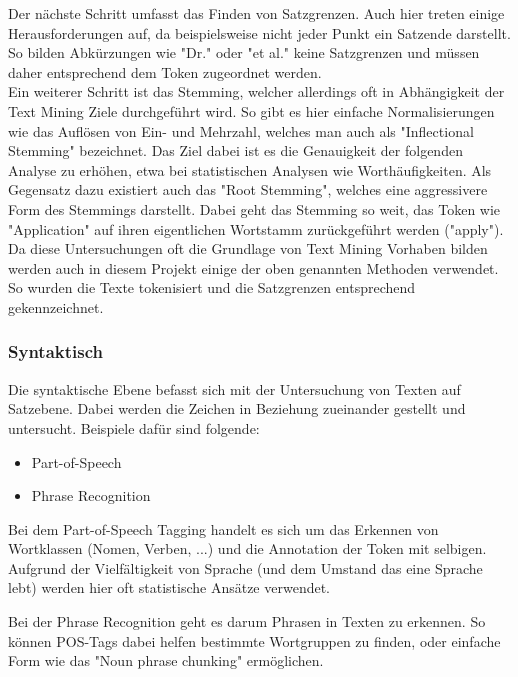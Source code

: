 Der nächste Schritt umfasst das Finden von Satzgrenzen. Auch hier treten einige Herausforderungen auf, da beispielsweise nicht jeder Punkt ein Satzende darstellt. So bilden Abkürzungen wie "Dr." oder "et al." keine Satzgrenzen und müssen daher entsprechend dem Token zugeordnet werden.\\

Ein weiterer Schritt ist das Stemming, welcher allerdings oft in Abhängigkeit der Text Mining Ziele durchgeführt wird. So gibt es hier einfache Normalisierungen wie das Auflösen von Ein- und Mehrzahl, welches man auch als "Inflectional Stemming" bezeichnet. Das Ziel dabei ist es die Genauigkeit der folgenden Analyse zu erhöhen, etwa bei statistischen Analysen wie Worthäufigkeiten. Als Gegensatz dazu existiert auch das "Root Stemming", welches eine aggressivere Form des Stemmings darstellt. Dabei geht das Stemming so weit, das Token wie "Application" auf ihren eigentlichen Wortstamm zurückgeführt werden ("apply").\\

Da diese Untersuchungen oft die Grundlage von Text Mining Vorhaben bilden werden auch in diesem Projekt einige der oben genannten Methoden verwendet. So wurden die Texte tokenisiert und die Satzgrenzen entsprechend gekennzeichnet.

\subsubsection{Syntaktisch}

Die syntaktische Ebene befasst sich mit der Untersuchung von Texten auf Satzebene. Dabei werden die Zeichen in Beziehung zueinander gestellt und untersucht. Beispiele dafür sind folgende:\\

\begin{itemize}
\item Part-of-Speech
\item Phrase Recognition
\end{itemize}

Bei dem Part-of-Speech Tagging handelt es sich um das Erkennen von Wortklassen (Nomen, Verben, ...) und die Annotation der Token mit selbigen. Aufgrund der Vielfältigkeit von Sprache (und dem Umstand das eine Sprache lebt) werden hier oft statistische Ansätze verwendet. 

Bei der Phrase Recognition geht es darum Phrasen in Texten zu erkennen. So können POS-Tags dabei helfen bestimmte Wortgruppen zu finden, oder einfache Form wie das "Noun phrase chunking" ermöglichen.\\

